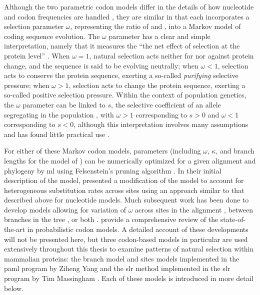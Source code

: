 Although the two parametric codon models differ in the details of how
nucleotide and codon frequencies are handled
\citep{Yang2000c,Bierne2003a}, they are similar in that each
incorporates a selection parameter $\omega$, representing the ratio of
\dn and \ds, into a Markov model of coding sequence evolution. The
$\omega$ parameter has a clear and simple interpretation, namely that
it measures the ``the net effect of selection at the protein level''
\citep{Yang2000CodonSubstitution}. When $\omega=1$, natural selection
acts neither for nor against protein change, and the sequence is said
to be evolving neutrally; when $\omega<1$, selection acts to conserve
the protein sequence, exerting a so-called \emph{purifying} selective
pressure; when $\omega>1$, selection acts to change the protein
sequence, exerting a so-called positive selection pressure. Within the
context of population genetics, the $\omega$ parameter can be linked
to $s$, the selective coefficient of an allele segregating in the
population \citep{Nielsen2003,Nielsen2005b,Kryazhimskiy2008}, with
$\omega>1$ corresponding to $s>0$ and $\omega<1$ corresponding to
$s<0$, although this interpretation involves many assumptions and has
found little practical use \citep{Nielsen2003,Nielsen2005b}.

For either of these Markov codon models, parameters (including
$\omega$, $\kappa$, and branch lengths for the model of
\citet{Goldman1994a}) can be numerically optimized for a given
alignment and phylogeny by \ac{ml} using Felsenstein's pruning
algorithm \citep{Felsenstein1981a,Goldman1994a,Yang2000c}. In their
initial description of the model, \citet{Goldman1994a} presented a
modification of the model to account for heterogeneous substitution
rates across sites using an approach similar to that described above
for nucleotide models. Much subsequent work has been done to develop
models allowing for variation of $\omega$ across sites in the
alignment \citep{Nielsen1998a,Yang2000CodonSubstitution,Yang2002,
  Wong2004,Yang2005Bayes,Massingham2005}, between branches in the tree
\citep{Yang1998a}, or both \citep{Yang2002b,Zhang2005a}.
\citet{Anisimova2009} provide a comprehensive review of the
state-of-the-art in probabilistic codon models. A detailed account of
these developments will not be presented here, but three codon-based
models in particular are used extensively throughout this thesis to
examine patterns of natural selection within mammalian proteins: the
branch model and sites models implemented in the \ac{paml} program by
Ziheng Yang \citep{Yang2007} and the \ac{slr} method implemented in
the \ac{slr} program by Tim Massingham \citep{Massingham2005}. Each of
these models is introduced in more detail below.

